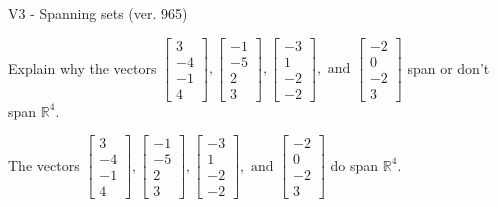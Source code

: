 \begin{exercise}
  \begin{exerciseTitle}V3 - Spanning sets (ver. 965)\end{exerciseTitle}
  \begin{exerciseStatement}
    Explain why the vectors \(\left[\begin{array}{r}
3 \\
-4 \\
-1 \\
4
\end{array}\right] , \left[\begin{array}{r}
-1 \\
-5 \\
2 \\
3
\end{array}\right] , \left[\begin{array}{r}
-3 \\
1 \\
-2 \\
-2
\end{array}\right] , \text{ and } \left[\begin{array}{r}
-2 \\
0 \\
-2 \\
3
\end{array}\right]\) span or don't span \(\mathbb{R}^4\). 
	


  \end{exerciseStatement}
  \begin{exerciseAnswer}
   The vectors \(\left[\begin{array}{r}
3 \\
-4 \\
-1 \\
4
\end{array}\right] , \left[\begin{array}{r}
-1 \\
-5 \\
2 \\
3
\end{array}\right] , \left[\begin{array}{r}
-3 \\
1 \\
-2 \\
-2
\end{array}\right] , \text{ and } \left[\begin{array}{r}
-2 \\
0 \\
-2 \\
3
\end{array}\right]\) 
  	 do  
	span \(\mathbb{R}^4\).
  


  \end{exerciseAnswer}
\end{exercise}
